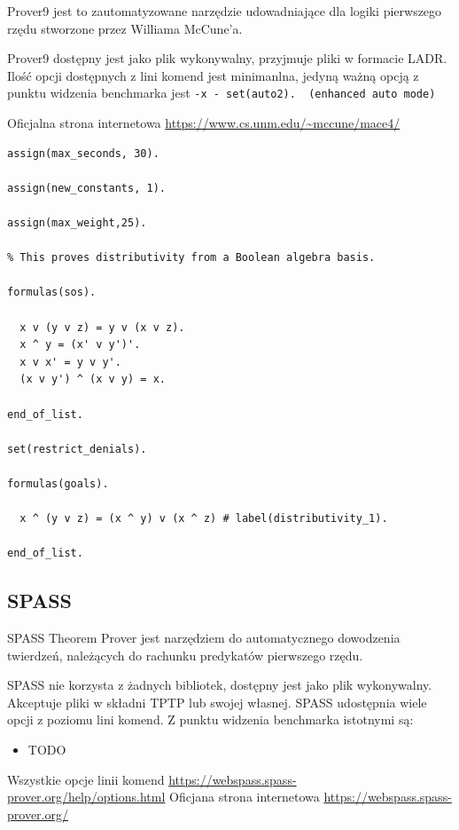 \documentclass[a4paper,12pt]{article}
\begin{document}
Prover9 jest to zautomatyzowane narzędzie udowadniające dla logiki pierwszego rzędu stworzone przez Williama McCune’a.

Prover9 dostępny jest jako plik wykonywalny, przyjmuje pliki w formacie \gls{LADR}. Ilość opcji dostępnych z lini komend jest minimanlna, jedyną ważną opcją z punktu widzenia benchmarka jest
\lstinline{-x - set(auto2).  (enhanced auto mode)}

Oficjalna strona internetowa \url{https://www.cs.unm.edu/~mccune/mace4/}


\begin{lstlisting}[caption={Przykład pliku w składni LADR}]
assign(max_seconds, 30).

assign(new_constants, 1).

assign(max_weight,25).

% This proves distributivity from a Boolean algebra basis.

formulas(sos).

  x v (y v z) = y v (x v z).
  x ^ y = (x' v y')'.
  x v x' = y v y'.
  (x v y') ^ (x v y) = x.

end_of_list.

set(restrict_denials).

formulas(goals).

  x ^ (y v z) = (x ^ y) v (x ^ z) # label(distributivity_1).

end_of_list.
\end{lstlisting}

\subsection{SPASS}

SPASS Theorem Prover jest narzędziem do automatycznego dowodzenia twierdzeń, należących do rachunku predykatów pierwszego rzędu.

SPASS nie korzysta z żadnych bibliotek, dostępny jest jako plik wykonywalny. Akceptuje pliki w składni TPTP lub swojej własnej. SPASS udostępnia wiele opcji z poziomu lini komend. Z punktu widzenia benchmarka istotnymi są:

\begin{itemize}
  \item TODO
\end{itemize}

\noindent
Wszystkie opcje linii komend \url{https://webspass.spass-prover.org/help/options.html}
\noindent \newline
Oficjana strona internetowa \url{https://webspass.spass-prover.org/}
\end{document}
